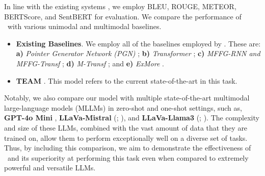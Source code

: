 In line with the existing systems \cite{Desai_Chakraborty_Akhtar_2022,jiang-2023-team}, we employ BLEU, ROUGE, METEOR, BERTScore, and SentBERT for evaluation.
We compare the performance of \model\ with various unimodal and multimodal baselines. 
\begin{itemize}[leftmargin=*, noitemsep, nolistsep]
\item{
\textbf{Existing Baselines}. We employ all of the baselines employed by \citet{Desai_Chakraborty_Akhtar_2022}. 
These are: 
\textbf{a)} \textit{Pointer Generator Network (PGN)} \citep{see-etal-2017-get};
\textbf{b)} \textit{Transformer} \citep{attention-is-all-you-need};
\textbf{c)} \textit{MFFG-RNN and MFFG-Transf} \citep{liu-etal-2020-multistage};
\textbf{d)} \textit{M-Transf} \citep{yao-wan-2020-multimodal}; and
\textbf{e)} \textit{ExMore} \citep{Desai_Chakraborty_Akhtar_2022}.
}
\item{\textbf{TEAM} \citep{jing-etal-2023-multi}. This model refers to the current state-of-the-art in this task.}   
\end{itemize}
Notably, we also compare our model with multiple state-of-the-art multimodal large-language models (MLLMs) in zero-shot and one-shot settings, such as, \textbf{GPT-4o Mini} \cite{openai2024gpt4technicalreport}, \textbf{LLaVa-Mistral} (\citealp{liu2024improved}; \citealp{jiang2023mistral}), and \textbf{LLaVa-Llama3} (\citealp{liu2024improved}; \citealp{dubey2024llama3herdmodels}). The complexity and size of these LLMs, combined with the vast amount of data that they are trained on, allow them to perform exceptionally well on a diverse set of tasks. Thus, by including this comparison, we aim to demonstrate the effectiveness of \model\ and its superiority at performing this task even when compared to extremely powerful and versatile LLMs.  

